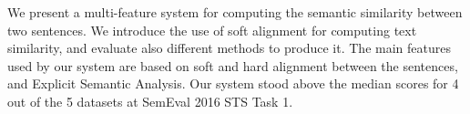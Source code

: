We present a multi-feature system for computing the semantic similarity between two sentences. We introduce the use of soft alignment for computing text similarity, and evaluate also different methods to produce it. The main features used by our system are based on soft and hard alignment between the sentences, and Explicit Semantic Analysis. Our system stood above the median scores for 4 out of the 5 datasets at SemEval 2016 STS Task 1.
